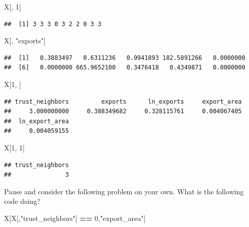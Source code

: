 \documentclass[]{book}
\newenvironment{Shaded}{\begin{snugshade}}{\end{snugshade}}
\newcommand{\DecValTok}[1]{\textcolor[rgb]{0.00,0.00,0.81}{#1}}
\newcommand{\StringTok}[1]{\textcolor[rgb]{0.31,0.60,0.02}{#1}}
\newcommand{\OperatorTok}[1]{\textcolor[rgb]{0.81,0.36,0.00}{\textbf{#1}}}
\newcommand{\NormalTok}[1]{#1}
\theoremstyle{definition}
\theoremstyle{definition}
\theoremstyle{definition}
\theoremstyle{remark}
\begin{document}
\begin{Shaded}
\begin{Highlighting}[]
\NormalTok{X[, }\DecValTok{1}\NormalTok{]}
\end{Highlighting}
\end{Shaded}

\begin{verbatim}
##  [1] 3 3 3 0 3 2 2 0 3 3
\end{verbatim}

\begin{Shaded}
\begin{Highlighting}[]
\NormalTok{X[, }\StringTok{"exports"}\NormalTok{]}
\end{Highlighting}
\end{Shaded}

\begin{verbatim}
##  [1]   0.3883497   0.6311236   0.9941893 182.5891266   0.0000000
##  [6]   0.0000000 665.9652100   0.3476418   0.4349871   0.0000000
\end{verbatim}

\begin{Shaded}
\begin{Highlighting}[]
\NormalTok{X[}\DecValTok{1}\NormalTok{, ]}
\end{Highlighting}
\end{Shaded}

\begin{verbatim}
## trust_neighbors         exports      ln_exports     export_area 
##     3.000000000     0.388349682     0.328115761     0.004067405 
##  ln_export_area 
##     0.004059155
\end{verbatim}

\begin{Shaded}
\begin{Highlighting}[]
\NormalTok{X[}\DecValTok{1}\NormalTok{, }\DecValTok{1}\NormalTok{]}
\end{Highlighting}
\end{Shaded}

\begin{verbatim}
## trust_neighbors 
##               3
\end{verbatim}

Pause and consider the following problem on your own. What is the
following code doing?

\begin{Shaded}
\begin{Highlighting}[]
\NormalTok{X[X[,}\StringTok{"trust_neighbors"}\NormalTok{] }\OperatorTok{==}\StringTok{ }\DecValTok{0}\NormalTok{,}\StringTok{"export_area"}\NormalTok{]}
\end{Highlighting}
\end{Shaded}
\end{document}
